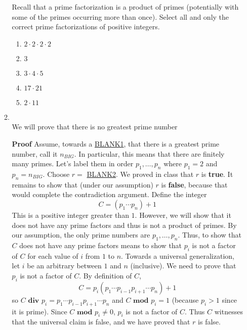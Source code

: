 \documentclass[12pt, oneside]{article}
\begin{document}
\begin{enumerate}
\begin{enumerate}
Recall that a prime factorization is a product of primes (potentially with some of the primes
occurring more than once).
Select all and only the correct prime factorizations of positive integers.

\begin{enumerate}
    \item $2\cdot 2 \cdot 2 \cdot 2$
    \item $3$
    \item $3 \cdot 4 \cdot 5$
    \item $17 \cdot 21$
    \item $2 \cdot 11$
\end{enumerate}         \item \hspace{1in}\\ 

We will prove that there is no greatest prime number

{\bf Proof} Assume, towards a \underline{BLANK1}, that 
there is a greatest prime number, call it $n_{BIG}$.
In particular, this means that there are finitely many 
primes. Let's label them in order $p_1, \ldots, p_n$ where 
$p_1 = 2$ and $p_n = n_{BIG}$.
Choose $r = $ \underline{BLANK2}. We proved in class
that $r$ is {\bf true}. It remains to show that (under our 
assumption) $r$ is {\bf false}, because
that would complete the contradiction argument.
Define the integer
\[
    C = (p_1 \cdots p_n) + 1
\]
This is a positive integer greater than $1$. 
However, we will show that it does not have any prime
factors and thus is not a product of primes.
By our assumption, the only prime numbers are $p_1, \ldots, 
p_n$. Thus, to show that $C$ does not have any prime
factors means to show that $p_i$ is not a factor 
of $C$ for each value of $i$ from $1$ to $n$. 
Towards a universal generalization, let $i$ be an arbitrary
between $1$ and $n$ (inclusive). We need to prove that $p_i$ is 
not a factor of $C$. By definition of $C$,
\[
    C = p_i ( p_1 \cdots p_{i-1} p_{i+1} \cdots p_n) + 1
\]
so $C \textbf{ div } p_i = p_1 \cdots p_{i-1} p_{i+1} \cdots p_n$
and $C \textbf{ mod } p_i = 1$ (because $p_i > 1$ since it is prime).
Since $C \textbf{ mod } p_i \neq 0$, $p_i$ is not a factor of $C$.
Thus $C$ witnesses that the universal claim is false, 
and we have proved that $r$ is false.





\end{enumerate}
\end{enumerate}
\end{document}

